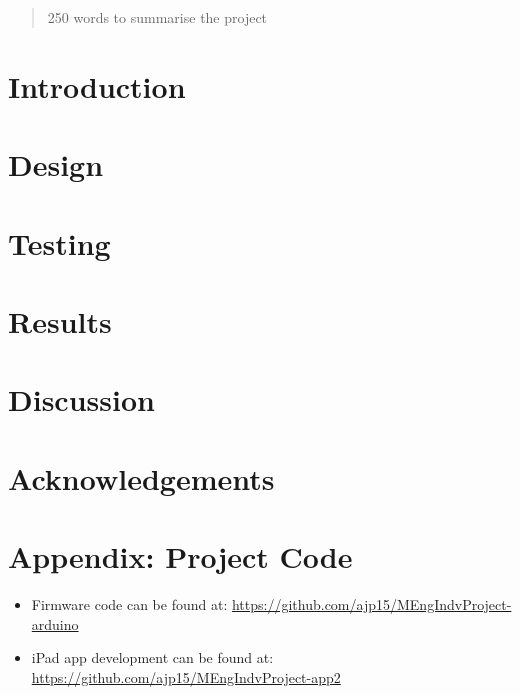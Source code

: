 \documentclass[12pt,twoside]{article}
\begin{document}


\begin{abstract}
    250 words to summarise the project
    
\end{abstract}

\newpage

\section{Introduction}

\newpage

\section{Design}

\newpage

\section{Testing}

\newpage

\section{Results}

\newpage

\section{Discussion}

\newpage

\section{Acknowledgements}

\newpage

%


\newpage

\appendix
\section{Appendix: Project Code}
\label{appendix: a}
\begin{itemize}
    \item Firmware code can be found at: \newline \url{https://github.com/ajp15/MEngIndvProject-arduino}
    \item iPad app development can be found at: \newline \url{https://github.com/ajp15/MEngIndvProject-app2}
\end{itemize}
\end{document}
